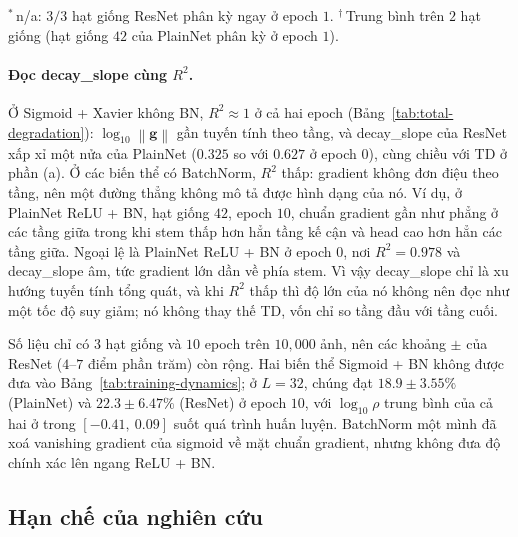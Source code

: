 \begin{table}[H]
\smallskip
\begin{minipage}{\linewidth}\scriptsize
$^{\ast}$\,n/a: $3/3$ hạt giống ResNet phân kỳ ngay ở epoch $1$.
$^{\dagger}$\,Trung bình trên $2$ hạt giống (hạt giống $42$ của PlainNet phân kỳ ở epoch $1$).
\end{minipage}
\end{table}

\paragraph{Đọc decay\_slope cùng $R^{2}$.} Ở Sigmoid + Xavier không BN, $R^{2}\approx1$ ở cả hai
epoch (Bảng~\ref{tab:total-degradation}): $\log_{10}\left\|\mathbf{g}\right\|$ gần tuyến tính theo tầng,
và decay\_slope của ResNet xấp xỉ một nửa của PlainNet ($0.325$ so với $0.627$ ở epoch $0$),
cùng chiều với TD ở phần (a). Ở các biến thể có BatchNorm, $R^{2}$ thấp: gradient không đơn điệu
theo tầng, nên một đường thẳng không mô tả được hình dạng của nó. Ví dụ, ở PlainNet ReLU + BN, hạt
giống $42$, epoch $10$, chuẩn gradient gần như phẳng ở các tầng giữa trong khi stem thấp hơn hẳn
tầng kế cận và head cao hơn hẳn các tầng giữa. Ngoại lệ là PlainNet ReLU + BN ở epoch $0$, nơi
$R^{2}=0.978$ và decay\_slope âm, tức gradient lớn dần về phía stem. Vì vậy decay\_slope chỉ là xu hướng tuyến
tính tổng quát, và khi $R^{2}$ thấp thì độ lớn của nó không nên đọc như một tốc độ suy giảm; nó không thay
thế TD, vốn chỉ so tầng đầu với tầng cuối.

\begin{notebox}
Số liệu chỉ có $3$ hạt giống và $10$ epoch trên $10{,}000$ ảnh, nên các khoảng
$\pm$ của ResNet ($4$--$7$ điểm phần trăm) còn rộng. Hai biến thể Sigmoid + BN
không được đưa vào Bảng~\ref{tab:training-dynamics}; ở $L=32$, chúng đạt
$18.9\pm3.55\%$ (PlainNet) và $22.3\pm6.47\%$ (ResNet) ở epoch $10$, với
$\log_{10}\rho$ trung bình của cả hai ở trong $[-0.41,\ 0.09]$ suốt quá trình huấn luyện.
BatchNorm một mình đã xoá vanishing gradient của sigmoid về mặt chuẩn gradient,
nhưng không đưa độ chính xác lên ngang ReLU + BN.
\end{notebox}

\subsection{Hạn chế của nghiên cứu}
\label{subsec:han-che}


